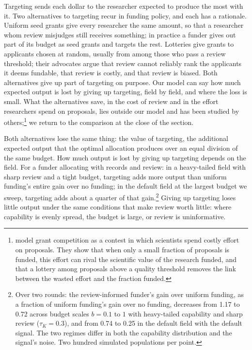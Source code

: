 \documentclass[article, 11pt, reqno]{amsart}
\theoremstyle{named}
\begin{document}
Targeting sends each dollar to the researcher expected to produce the most with it. Two alternatives to targeting recur in funding policy, and each has a rationale. Uniform seed grants give every researcher the same amount, so that a researcher whom review misjudges still receives something; in practice a funder gives out part of its budget as seed grants and targets the rest. Lotteries give grants to applicants chosen at random, usually from among those who pass a review threshold; their advocates argue that review cannot reliably rank the applicants it deems fundable, that review is costly, and that review is biased. Both alternatives give up part of targeting on purpose. Our model can say how much expected output is lost by giving up targeting, field by field, and where the loss is small. What the alternatives save, in the cost of review and in the effort researchers spend on proposals, lies outside our model and has been studied by others;\footnote{\citet{GrossBergstrom2019} model grant competition as a contest in which scientists spend costly effort on proposals. They show that when only a small fraction of proposals is funded, this effort can rival the scientific value of the research funded, and that a lottery among proposals above a quality threshold removes the link between the wasted effort and the fraction funded.} we return to the comparison at the close of the section.

Both alternatives lose the same thing: the value of targeting, the additional expected output that the optimal allocation produces over an equal division of the same budget. How much output is lost by giving up targeting depends on the field. For a funder allocating with records and review: in a heavy-tailed field with sharp review and a tight budget, targeting adds more output than uniform funding's entire gain over no funding; in the default field at the largest budget we sweep, targeting adds about a quarter of that gain.\footnote{Over two rounds: the review-informed funder's gain over uniform funding, as a fraction of uniform funding's gain over no funding, decreases from 1.17 to 0.72 across budget scales $b = 0.1$ to $1$ with heavy-tailed capability and sharp review ($\tau_K = 0.3$), and from 0.74 to 0.25 in the default field with the default signal. The two regimes differ in both the capability distribution and the signal's noise. Two hundred simulated populations per point.} Giving up targeting loses little output under the same conditions that make review worth little: where capability is evenly spread, the budget is large, or review is uninformative.
\end{document}
